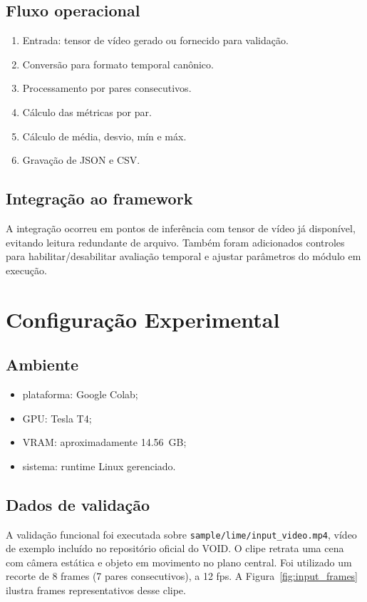 \documentclass[conference]{IEEEtran}
\begin{document}
\subsection{Fluxo operacional}
\begin{enumerate}
    \item Entrada: tensor de vídeo gerado ou fornecido para validação.
    \item Conversão para formato temporal canônico.
    \item Processamento por pares consecutivos.
    \item Cálculo das métricas por par.
    \item Cálculo de média, desvio, mín e máx.
    \item Gravação de JSON e CSV.
\end{enumerate}

\subsection{Integração ao framework}
A integração ocorreu em pontos de inferência com tensor de vídeo já disponível, evitando leitura redundante de arquivo. Também foram adicionados controles para habilitar/desabilitar avaliação temporal e ajustar parâmetros do módulo em execução.

\section{Configuração Experimental}
\subsection{Ambiente}
\begin{itemize}
    \item plataforma: Google Colab;
    \item GPU: Tesla T4;
    \item VRAM: aproximadamente \SI{14.56}{GB};
    \item sistema: runtime Linux gerenciado.
\end{itemize}

\subsection{Dados de validação}
A validação funcional foi executada sobre \texttt{sample/lime/input\_video.mp4}, vídeo de exemplo incluído no repositório oficial do VOID. O clipe retrata uma cena com câmera estática e objeto em movimento no plano central. Foi utilizado um recorte de 8 frames (7 pares consecutivos), a 12 fps. A Figura~\ref{fig:input_frames} ilustra frames representativos desse clipe.
\end{document}
